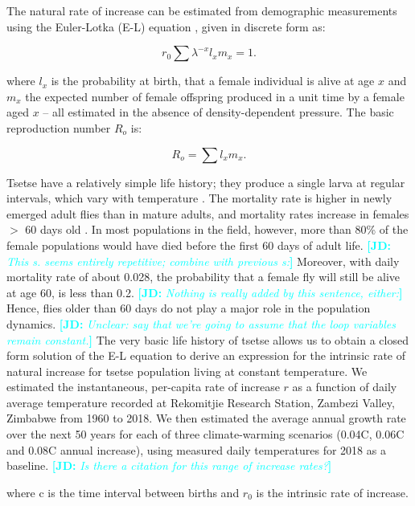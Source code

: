 \documentclass[12pt,a4paper]{article}
\newcommand{\comment}[3]{\textcolor{#1}{\textbf{[#2: }\textsl{#3}\textbf{]}}}
\newcommand{\jd}[1]{\comment{cyan}{JD}{#1}}
\begin{document}
The natural rate of increase can be estimated from demographic measurements using the Euler-Lotka (E-L) equation \cite{Birch1948,Zidon2015}, given in discrete form as:

\begin{equation}
\label{equation3}
r_0 \sum \lambda^{-x}l_{x}m_{x} = 1.
\end{equation}

where  $l_{x}$ is the probability at birth, that a female individual is alive at age $x$ and $m_{x}$ the expected number of female offspring produced in a unit time by a female aged $x$ -- all estimated in the absence of density-dependent pressure.
The basic reproduction number $R_{o}$ is:

\begin{equation}
\label{equation4}
R_{o}= \sum l_{x}m_{x}. 
\end{equation}

Tsetse have a relatively simple life history; they produce a single larva at regular intervals, which vary with temperature \cite{hargrove2003tsetse}. The mortality rate is higher in newly emerged adult flies than in mature adults, and mortality rates increase in females $>$ 60 days old \cite{hargrove2020model}. In most populations in the field, however, more than 80\% of the female populations would have died before the first 60 days of adult life. \jd{This s. seems entirely repetitive; combine with previous s:} Moreover, with daily mortality rate of about 0.028, the probability that a female fly will still be alive at age 60, is less than 0.2.  \jd{Nothing is really added by this sentence, either:} Hence, flies older than 60 days do not play a major role in the population dynamics.  \jd{Unclear: say that we're going to assume that the loop variables remain constant.} The very basic life history of tsetse allows us to obtain a closed form solution of the E-L equation to derive an expression for the intrinsic rate of natural increase for tsetse population living at constant temperature. We estimated the instantaneous, per-capita rate of increase $r$ as a function of daily average temperature recorded at Rekomitjie Research Station, Zambezi Valley, Zimbabwe from 1960 to 2018. We then estimated the average annual growth rate over the next 50 years for each of three climate-warming scenarios (0.04\textdegree C, 0.06\textdegree C and 0.08\textdegree C annual increase), using measured daily temperatures for 2018 as a baseline. 
\jd{Is there a citation for this range of increase rates?}

where c is the time interval between births and $r_0$ is the intrinsic rate of increase.
	
\end{document}
